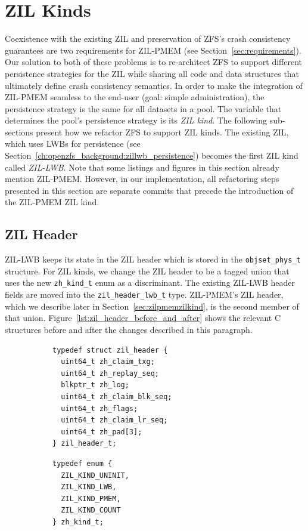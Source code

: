 \documentclass[12pt,a4paper,twoside]{book}
\begin{document}
{\section{ZIL Kinds}\label{ch:zilkinds}
Coexistence with the existing ZIL and preservation of ZFS's crash consistency guarantees are two requirements for ZIL-PMEM (see Section~\ref{sec:requirements}).
Our solution to both of these problems is to re-architect ZFS to support different persistence strategies for the ZIL while sharing all code and data structures that ultimately define crash consistency semantics.
In order to make the integration of ZIL-PMEM seamless to the end-user (goal: simple administration), the persistence strategy is the same for all datasets in a pool.
The variable that determines the pool's persistence strategy is its \textit{ZIL kind}.
The following sub-sections present how we refactor ZFS to support ZIL kinds.
The existing ZIL, which uses LWBs for persistence (see Section~\ref{ch:openzfs_background:zillwb_persistence}) becomes the first ZIL kind called \textit{ZIL-LWB}.
Note that some listings and figures in this section already mention ZIL-PMEM.
However, in our implementation, all refactoring steps presented in this section are separate commits that precede the introduction of the ZIL-PMEM ZIL kind.

\subsection{ZIL Header}\label{sec:di:zil_header}
ZIL-LWB keeps its state in the ZIL header which is stored in the \lstinline{objset_phys_t} structure.
For ZIL kinds, we change the ZIL header to be a tagged union that uses the new \lstinline{zh_kind_t} enum as a discriminant.
The existing ZIL-LWB header fields are moved into the \lstinline{zil_header_lwb_t} type.
ZIL-PMEM's ZIL header, which we describe later in Section~\ref{sec:zilpmemzilkind}, is the second member of that union.
Figure~\ref{lst:zil_header_before_and_after} shows the relevant C structures before and after the changes described in this paragraph.

\begin{figure}[H]
\begin{subfigure}[t]{0.45\textwidth}
\begin{lstlisting}[basicstyle=\scriptsize\ttfamily]
typedef struct zil_header {
  uint64_t zh_claim_txg;
  uint64_t zh_replay_seq;
  blkptr_t zh_log;
  uint64_t zh_claim_blk_seq;
  uint64_t zh_flags;
  uint64_t zh_claim_lr_seq;
  uint64_t zh_pad[3];
} zil_header_t;
\end{lstlisting}
\end{subfigure}
\hfill
\begin{subfigure}[t]{0.5\textwidth}
\begin{lstlisting}[basicstyle=\scriptsize\ttfamily]
typedef enum {
  ZIL_KIND_UNINIT,
  ZIL_KIND_LWB,
  ZIL_KIND_PMEM,
  ZIL_KIND_COUNT
} zh_kind_t;


\end{lstlisting}
\end{subfigure}
\end{figure}}
\end{document}
